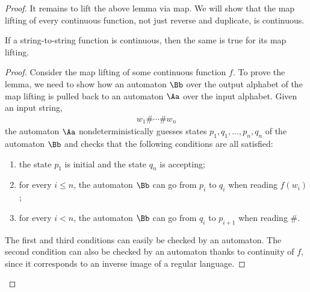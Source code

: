 \begin{proof}
It remains to lift the above lemma via map. We will show that the map lifting of every continuous function, not just reverse and duplicate, is continuous.
    \begin{lemma}
    \label{lem:map-lifting-continuous}
    If a string-to-string function is continuous, then the same is true for  its map lifting.
    \end{lemma}
    \begin{proof}
Consider the map lifting of some continuous  function $f$. To prove the lemma, we need to show how an automaton $\Bb$ over the output alphabet of the map lifting  is pulled back to an automaton $\Aa$ over the input alphabet.    Given an input string, 
\begin{align*}
w_1 \# \cdots \# w_n
\end{align*}
the automaton $\Aa$ 
nondeterministically guesses states $p_1,q_1,\ldots,p_n,q_n$ of  the automaton  $\Bb$ and checks that the following conditions are all satisfied:
\begin{enumerate}
    \item the state $p_1$ is initial and the state $q_n$ is accepting;
    \item for every $i\leq n$, the automaton $\Bb$ can go from $p_i$ to $q_i$ when reading $f(w_i)$;
    \item for every $i < n$, the automaton $\Bb$ can go from $q_i$ to $p_{i+1}$ when reading $\#$.
\end{enumerate}
The first and third conditions can easily be checked by an automaton. 
The second condition can also  be checked by an automaton thanks to continuity of $f$, since it corresponds to an inverse image of a regular language. 
    \end{proof}
\end{proof}

